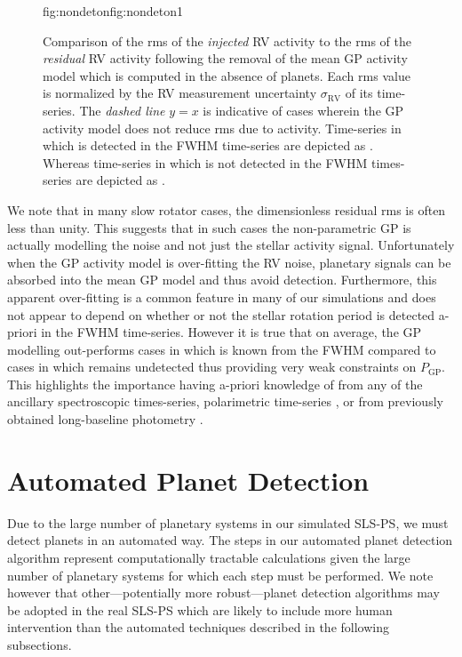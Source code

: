 \begin{figure}
\begin{ocg}{fig:nondeton}{fig:nondeton}{1}
  \end{ocg}
  \hspace{-0.6\hsize}%
  \caption[GP activity model performance in simulated SPIRou RV timeseries.]
    {\small Comparison of the rms of the \emph{injected} RV activity to the rms of the \emph{residual} RV activity following
    the removal of the mean GP activity model which is
    computed in the absence of planets. Each rms value is normalized by the
    RV measurement uncertainty $\sigma_{\text{RV}}$ of its time-series. The \emph{dashed line} $y=x$ is indicative of cases
    wherein the GP activity model does not reduce rms due to activity. Time-series in which \prot{} is detected in the
    FWHM time-series are depicted as 
    . Whereas time-series in which \prot{} is not detected in
    the FWHM times-series are depicted as .}
  \label{BSfig:compareGPres}
\end{figure}

We note that in many slow rotator cases, the dimensionless residual rms is often less than unity. This suggests that in such
cases the non-parametric GP is actually modelling the noise and not just the stellar activity signal.
Unfortunately when the GP activity model is over-fitting the RV noise, planetary signals can be absorbed into the mean GP
model and thus avoid detection. Furthermore,
this apparent over-fitting is a common feature in many of our simulations and does not appear to depend on
whether or not the stellar rotation period is detected a-priori in the FWHM time-series.
However it is true that on average,
the GP modelling out-performs cases in which \prot{} is known from the FWHM compared to cases in which \prot{} remains
undetected thus providing very weak constraints on $P_{\text{GP}}$.
This highlights the importance having a-priori knowledge of \prot{} from any of the
ancillary spectroscopic times-series, polarimetric time-series \citep{hebrard16},
or from previously obtained long-baseline photometry \citep[e.g.][]{newton16a}.


\section{Automated Planet Detection} \label{BSsect:detection}
Due to the large number of planetary systems in our simulated SLS-PS, we must detect planets in an automated
way. The steps in our automated planet detection algorithm
represent computationally tractable calculations given the large number of planetary systems
for which each step must be performed. We note however that other---potentially more robust---planet
detection algorithms may be adopted in the real SLS-PS which are likely to include more
human intervention than the automated techniques described in the following subsections.

